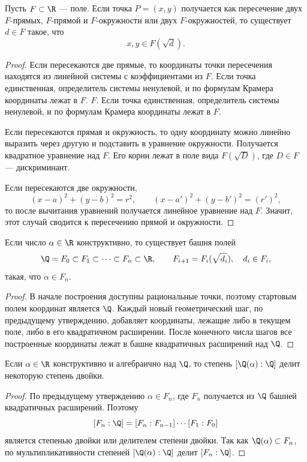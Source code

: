 \begin{stmt}
    Пусть $F \subset \R$ --- поле. Если точка $P=(x,y)$ получается как пересечение двух $F$-прямых, $F$-прямой и
    $F$-окружности или двух $F$-окружностей, то существует $d \in F$ такое, что
    \[
        x,y \in F(\sqrt d).
    \]

    \begin{proof}
        Если пересекаются две прямые, то координаты точки пересечения находятся из линейной системы с коэффициентами из
        $F$. Если точка единственная, определитель системы ненулевой, и по формулам Крамера координаты лежат в $F$.
        $F$. Если точка единственная, определитель системы ненулевой, и по формулам Крамера координаты лежат в $F$.

        Если пересекаются прямая и окружность, то одну координату можно линейно выразить через другую и подставить в уравнение окружности.
        Получается квадратное уравнение над $F$. Его корни лежат в поле вида $F(\sqrt D)$, где $D \in F$ --- дискриминант.

        Если пересекаются две окружности,
        \[
            (x-a)^2+(y-b)^2=r^2, \qquad (x-a')^2+(y-b')^2=(r')^2,
        \]
        то после вычитания уравнений получается линейное уравнение над $F$. Значит, этот случай сводится к пересечению прямой и окружности.
    \end{proof}
\end{stmt}

\begin{stmt}
    Если число $\alpha \in \R$ конструктивно, то существует башня полей
    \[
        \Q = F_0 \subset F_1 \subset \cdots \subset F_n \subset \R,
        \qquad F_{i+1}=F_i(\sqrt{d_i}), \quad d_i \in F_i,
    \]
    такая, что $\alpha \in F_n$.

    \begin{proof}
        В начале построения доступны рациональные точки, поэтому стартовым полем координат является $\Q$.
        Каждый новый геометрический шаг, по предыдущему утверждению, добавляет координаты, лежащие либо в текущем поле,
        либо в его квадратичном расширении. После конечного числа шагов все построенные координаты лежат в башне квадратичных расширений над $\Q$.
    \end{proof}
\end{stmt}

\begin{cor}
    Если $\alpha \in \R$ конструктивно и алгебраично над $\Q$, то степень $[\Q(\alpha):\Q]$ делит некоторую степень двойки.

    \begin{proof}
        По предыдущему утверждению $\alpha \in F_n$, где $F_n$ получается из $\Q$ башней квадратичных расширений. Поэтому
        \[
            [F_n:\Q] = [F_n:F_{n-1}]\cdots [F_1:F_0]
        \]
        является степенью двойки или делителем степени двойки. Так как $\Q(\alpha) \subset F_n$, по мультипликативности степеней
        $[\Q(\alpha):\Q]$ делит $[F_n:\Q]$.
    \end{proof}
\end{cor}

